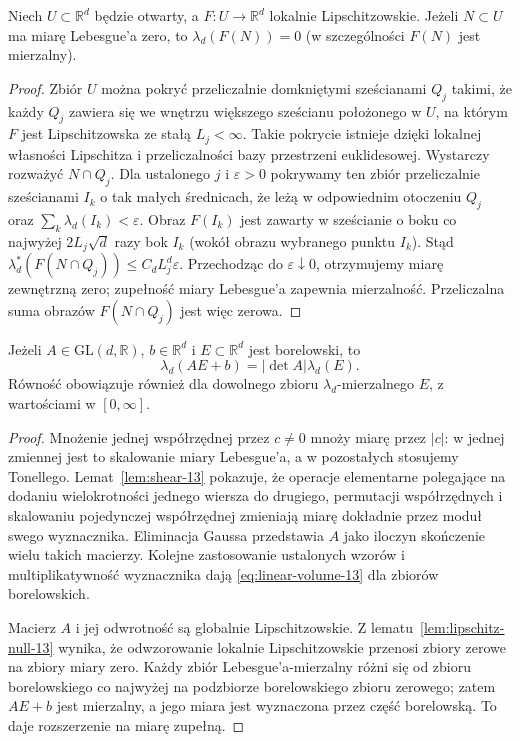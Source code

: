 \begin{lemat}
\label{lem:lipschitz-null-13}
Niech $U\subset\mathbb R^d$ będzie otwarty, a
$F:U\to\mathbb R^d$ lokalnie Lipschitzowskie.
Jeżeli $N\subset U$ ma miarę Lebesgue'a zero, to
$\lambda_d(F(N))=0$ (w szczególności $F(N)$ jest mierzalny).
\end{lemat}
\begin{proof}
Zbiór $U$ można pokryć przeliczalnie domkniętymi sześcianami
$Q_j$ takimi, że każdy $Q_j$ zawiera się we wnętrzu
większego sześcianu położonego w $U$, na którym $F$
jest Lipschitzowska ze stałą $L_j<\infty$.
Takie pokrycie istnieje dzięki lokalnej własności
Lipschitza i przeliczalności bazy przestrzeni euklidesowej. Wystarczy rozważyć $N\cap Q_j$.
Dla ustalonego $j$ i $\varepsilon>0$ pokrywamy ten zbiór
przeliczalnie sześcianami $I_k$ o tak małych średnicach,
że leżą w odpowiednim otoczeniu $Q_j$ oraz
$\sum_k\lambda_d(I_k)<\varepsilon$.
Obraz $F(I_k)$ jest zawarty w sześcianie o boku
co najwyżej $2L_j\sqrt d$ razy bok $I_k$ (wokół
obrazu wybranego punktu $I_k$). Stąd
$\lambda_d^*(F(N\cap Q_j))\le C_d L_j^d\varepsilon$.
Przechodząc do $\varepsilon\downarrow0$, otrzymujemy
miarę zewnętrzną zero; zupełność miary Lebesgue'a
zapewnia mierzalność. Przeliczalna suma obrazów
$F(N\cap Q_j)$ jest więc zerowa.
\end{proof}

\begin{twierdzenie}
\label{thm:linear-change-13}
Jeżeli $A\in\mathrm{GL}(d,\mathbb R)$, $b\in\mathbb R^d$
i $E\subset\mathbb R^d$ jest borelowski, to
\begin{equation}\label{eq:linear-volume-13}
\lambda_d(AE+b)=|\det A|\lambda_d(E).
\end{equation}
Równość obowiązuje również dla dowolnego zbioru
$\lambda_d$-mierzalnego $E$, z wartościami w $[0,\infty]$.
\end{twierdzenie}
\begin{proof}
Mnożenie jednej współrzędnej przez $c\ne0$ mnoży miarę
przez $|c|$: w jednej zmiennej jest to skalowanie miary
Lebesgue'a, a w pozostałych stosujemy Tonellego.
Lemat~\ref{lem:shear-13} pokazuje, że operacje elementarne
polegające na dodaniu wielokrotności jednego wiersza do drugiego,
permutacji współrzędnych i skalowaniu pojedynczej współrzędnej
zmieniają miarę dokładnie przez moduł swego wyznacznika.
Eliminacja Gaussa przedstawia $A$ jako iloczyn skończenie
wielu takich macierzy. Kolejne zastosowanie ustalonych wzorów
i multiplikatywność wyznacznika dają \eqref{eq:linear-volume-13}
dla zbiorów borelowskich.

Macierz $A$ i jej odwrotność są globalnie Lipschitzowskie.
Z lematu~\ref{lem:lipschitz-null-13} wynika, że odwzorowanie lokalnie
Lipschitzowskie przenosi zbiory zerowe na zbiory miary zero.
Każdy zbiór Lebesgue'a-mierzalny różni się od zbioru borelowskiego
co najwyżej na podzbiorze borelowskiego zbioru zerowego;
zatem $AE+b$ jest mierzalny, a jego miara jest wyznaczona
przez część borelowską. To daje rozszerzenie na miarę zupełną.
\end{proof}

